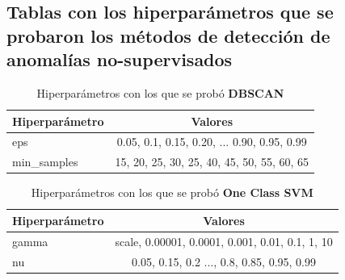 \begin{appendices}
	\section*{Tablas con los hiperparámetros que se probaron los métodos de detección de anomalías no-supervisados}

		\begin{table}[htb]
			\centering
			\caption{Hiperparámetros con los que se probó \textbf{DBSCAN}}
			\label{table:4}
			\begin{tabular}{lc}
			\toprule
			Hiperparámetro &                                     Valores \\
			\midrule
					   eps & 0.05, 0.1, 0.15, 0.20, ... 0.90, 0.95, 0.99 \\
			   min\_samples & 15, 20, 25, 30, 25, 40,  45, 50, 55, 60, 65 \\
			\bottomrule
			\end{tabular}
		\end{table}

			
		
		\begin{table}[htb]
			\centering
			\caption{Hiperparámetros con los que se probó \textbf{One Class SVM}}
			\label{table:5}
			\begin{tabular}{lc}
			\toprule
			Hiperparámetro &                                            Valores \\
			\midrule
					 gamma &    scale, 0.00001, 0.0001, 0.001, 0.01, 0.1, 1, 10 \\
						nu & 0.05, 0.15, 0.2 ..., 0.8, 0.85, 0.95, 0.99 \\
			\bottomrule
			\end{tabular}
		\end{table}
		


\end{appendices}
